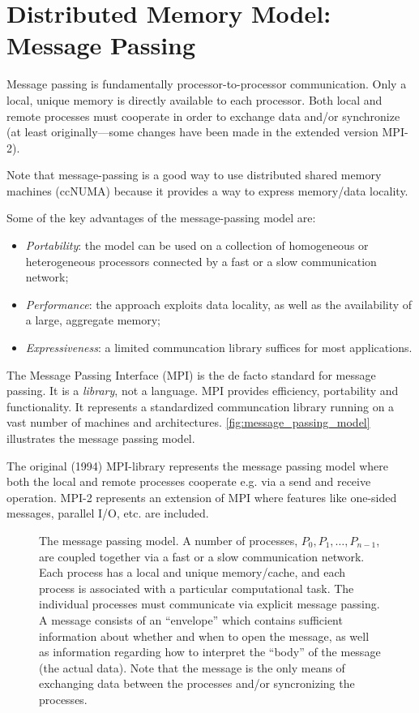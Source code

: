 \section{Distributed Memory Model: Message Passing}

Message passing is fundamentally processor-to-processor communication. Only a
local, unique memory is directly available to each processor. Both local and
remote processes must cooperate in order to exchange data and/or synchronize (at
least originally---some changes have been made in the extended version MPI-2).

Note that message-passing is a good way to use distributed shared memory
machines (ccNUMA) because it provides a way to express memory/data locality.

Some of the key advantages of the message-passing model are:
\begin{itemize}
\item {\em Portability}: the model can be used on a collection of
homogeneous or heterogeneous processors connected by a fast or a slow
communication network;
\item {\em Performance}: the approach exploits data locality, as well as the
availability of a large, aggregate memory;
\item {\em Expressiveness}: a limited communcation library suffices for most applications.
\end{itemize}

The Message Passing Interface (MPI) is the de facto standard for message
passing. It is a \emph{library}, not a language. MPI provides efficiency,
portability and functionality. It represents a standardized communcation library
running on a vast number of machines and architectures.
\autoref{fig:message_passing_model} illustrates the message passing model.

The original (1994) MPI-library represents the message passing model where both
the local and remote processes cooperate e.g. via a send and receive
operation. MPI-2 represents an extension of MPI where features like one-sided
messages, parallel I/O, etc. are included.

\begin{figure}
  \centering
  
  \caption{
    The message passing model. A number of processes, $P_0, P_1, \ldots,
    P_{n-1}$, are coupled together via a fast or a slow communication network.
    Each process has a local and unique memory/cache, and each process is
    associated with a particular computational task. The individual processes
    must communicate via explicit message passing. A message consists of an
    ``envelope'' which contains sufficient information about whether and when to
    open the message, as well as information regarding how to interpret the
    ``body'' of the message (the actual data). Note that the message is the only
    means of exchanging data between the processes and/or syncronizing the
    processes.
  }
  \label{fig:message_passing_model}
\end{figure}

